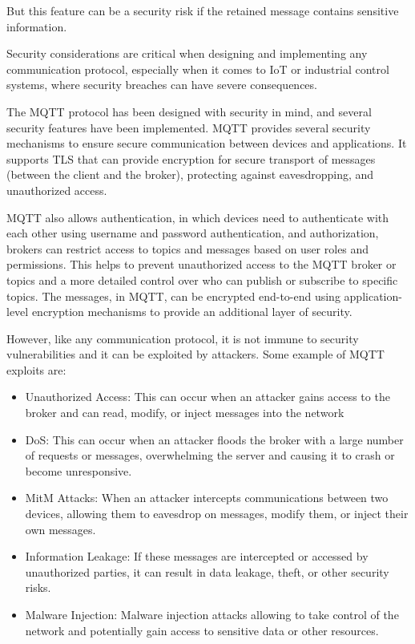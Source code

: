 But this feature can be a security risk if the retained message contains sensitive information.

Security considerations are critical when designing and implementing any communication protocol, especially when it comes to IoT or industrial control systems, where security breaches can have severe consequences.

The \acs{MQTT} protocol has been designed with security in mind, and several security features have been implemented. 
\acs{MQTT} provides several security mechanisms to ensure secure communication between devices and applications.
It supports \ac{TLS} that can provide encryption for secure transport of messages (between the client and the broker), protecting against eavesdropping, and unauthorized access.

\acs{MQTT} also allows authentication, in which devices need to authenticate with each other using username and password authentication, and authorization, brokers can restrict access to topics and messages based on user roles and permissions.
This helps to prevent unauthorized access to the \acs{MQTT} broker or topics and a more detailed control over who can publish or subscribe to specific topics.
The messages, in \acs{MQTT}, can be encrypted end-to-end using application-level encryption mechanisms to provide an additional layer of security.

However, like any communication protocol, it is not immune to security vulnerabilities and it can be exploited by attackers. 
Some example of \acs{MQTT} exploits are:
\begin{itemize}
    \item Unauthorized Access: This can occur when an attacker gains access to the broker and can read, modify, or inject messages into the network
    \item \ac{DoS}: This can occur when an attacker floods the broker with a large number of requests or messages, overwhelming the server and causing it to crash or become unresponsive.
    \item \ac{MitM} Attacks: When an attacker intercepts communications between two devices, allowing them to eavesdrop on messages, modify them, or inject their own messages.
    \item Information Leakage: If these messages are intercepted or accessed by unauthorized parties, it can result in data leakage, theft, or other security risks.
    \item Malware Injection: Malware injection attacks allowing to take control of the network and potentially gain access to sensitive data or other resources.
\end{itemize}

